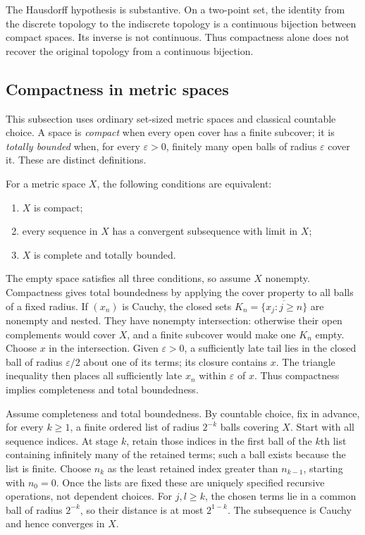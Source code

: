 The Hausdorff hypothesis is substantive. On a two-point set, the
identity from the discrete topology to the indiscrete topology is a
continuous bijection between compact spaces. Its inverse is not
continuous. Thus compactness alone does not recover the original
topology from a continuous bijection.

\subsection{Compactness in metric spaces}
This subsection uses ordinary set-sized metric spaces and classical
countable choice. A space is \emph{compact} when every open cover has
a finite subcover; it is \emph{totally bounded} when, for every
$\varepsilon>0$, finitely many open balls of radius $\varepsilon$
cover it. These are distinct definitions.

\begin{theorem}
For a metric space $X$, the following conditions are equivalent:
\begin{enumerate}
\item $X$ is compact;
\item every sequence in $X$ has a convergent subsequence with limit in $X$;
\item $X$ is complete and totally bounded.
\end{enumerate}
\end{theorem}
\Proof
The empty space satisfies all three conditions, so assume $X$ nonempty.
Compactness gives total boundedness by applying the cover property to
all balls of a fixed radius. If $(x_n)$ is Cauchy, the closed sets
$K_n=\overline{\{x_j:j\geq n\}}$ are nonempty and nested.
They have nonempty intersection: otherwise their open complements
would cover $X$, and a finite subcover would make one $K_n$ empty.
Choose $x$ in the intersection. Given $\varepsilon>0$, a sufficiently
late tail lies in the closed ball of radius $\varepsilon/2$ about one
of its terms; its closure contains $x$. The triangle inequality then
places all sufficiently late $x_n$ within $\varepsilon$ of $x$.
Thus compactness implies completeness and total boundedness.

Assume completeness and total boundedness. By countable choice, fix in
advance, for every $k\geq1$, a finite ordered list of radius $2^{-k}$
balls covering $X$. Start with all sequence indices. At stage $k$,
retain those indices in the first ball of the $k$th list containing
infinitely many of the retained terms; such a ball exists because the
list is finite. Choose $n_k$ as the least retained index greater than
$n_{k-1}$, starting with $n_0=0$. Once the lists are fixed these are
uniquely specified recursive operations, not dependent choices.
For $j,l\geq k$,
the chosen terms lie in a common ball of radius $2^{-k}$, so their
distance is at most $2^{1-k}$. The subsequence is Cauchy and hence
converges in $X$.

